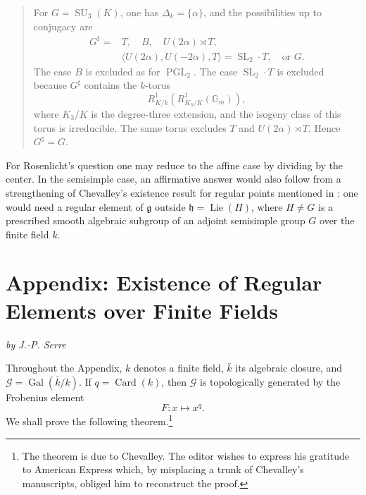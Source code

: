 \begin{quote}
For \(G=\operatorname{SU}_3(K)\), one has
\(\Delta_k=\{\alpha\}\), and the possibilities up to conjugacy
are
\[
 \begin{split}
  G^\sharp={}&T,\quad B,\quad U(2\alpha)\rtimes T,\\
             &\langle U(2\alpha),U(-2\alpha),T\rangle
               =\operatorname{SL}_2\cdot T,\quad\text{or }G.
 \end{split}
\]
The case \(B\) is excluded as for \(\operatorname{PGL}_2\). The
case \(\operatorname{SL}_2\cdot T\) is excluded because
\(G^\sharp\) contains the \(k\)-torus
\[
  R^1_{K/k}\!\left(R^1_{K_3/K}(\mathbb G_m)\right),
\]
where \(K_3/K\) is the degree-three extension, and the isogeny
class of this torus is irreducible. The same torus excludes
\(T\) and \(U(2\alpha)\rtimes T\). Hence \(G^\sharp=G\).
\end{quote}

For Rosenlicht's question one may reduce to the affine case by
dividing by the center. In the semisimple case, an affirmative
answer would also follow from a strengthening of Chevalley's
existence result for regular points mentioned in : one would
need a regular element of \(\mathfrak g\) outside
\(\mathfrak h=\operatorname{Lie}(H)\), where \(H\ne G\) is a
prescribed smooth algebraic subgroup of an adjoint semisimple
group \(G\) over the finite field \(k\).



\section{Appendix: Existence of Regular Elements over Finite Fields}

\begin{center}
\itshape by J.-P. Serre
\end{center}

Throughout the Appendix, \(k\) denotes a finite field,
\(\bar k\) its algebraic closure, and
\(\mathcal G=\operatorname{Gal}(\bar k/k)\). If
\(q=\operatorname{Card}(k)\), then \(\mathcal G\) is
topologically generated by the Frobenius element
\[
  F\colon x\longmapsto x^q.
\]
We shall prove the following theorem.\footnote{The theorem is due
to Chevalley. The editor wishes to express his gratitude to
American Express which, by misplacing a trunk of Chevalley's
manuscripts, obliged him to reconstruct the proof.}

